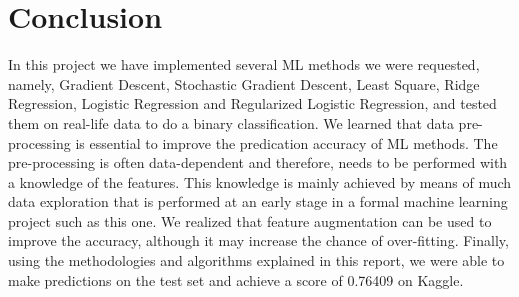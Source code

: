 \documentclass[10pt,conference,compsocconf]{IEEEtran}
\begin{document}
\section{Conclusion}
In this project we have implemented several \gls{ML} methods we were requested, namely, Gradient Descent, Stochastic Gradient Descent, Least Square, Ridge Regression, Logistic Regression and Regularized Logistic Regression, and tested them on real-life data to do a binary classification.
We learned that data pre-processing is essential to improve the predication accuracy of \gls{ML} methods. The pre-processing is often data-dependent and therefore, needs to be performed with a knowledge of the features. This knowledge is mainly achieved by means of much data exploration that is performed at an early stage in a formal machine learning project such as this one.
We realized that feature augmentation can be used to improve the accuracy, although it may increase the chance of over-fitting.
Finally, using the methodologies and algorithms explained in this report, we were able to make predictions on the test set and achieve a score of 0.76409 on Kaggle.  

%
%
\end{document}
